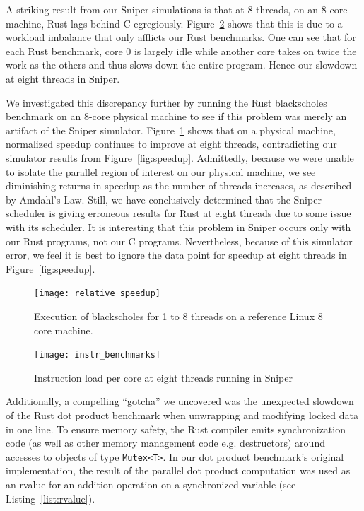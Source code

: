 A striking result from our Sniper simulations is that at 8 threads, on an 8 core machine, Rust lags behind C egregiously. Figure~\ref{fig:instr_load} shows that this is due to a workload imbalance that only afflicts our Rust benchmarks. One can see that for each Rust benchmark, core 0 is largely idle while another core takes on twice the work as the others and thus slows down the entire program. Hence our slowdown at eight threads in Sniper.

We investigated this discrepancy further by running the Rust blackscholes benchmark on an 8-core physical machine to see if this problem was merely an artifact of the Sniper simulator. Figure~\ref{fig:baremetal} shows that on a physical machine, normalized speedup continues to improve at eight threads, contradicting our simulator results from Figure~\ref{fig:speedup}. Admittedly, because we were unable to isolate the parallel region of interest on our physical machine, we see diminishing returns in speedup as the number of threads increases, as described by Amdahl's Law. Still, we have conclusively determined that the Sniper scheduler is giving erroneous results for Rust at eight threads due to some issue with its scheduler. It is interesting that this problem in Sniper occurs only with our Rust programs, not our C programs. Nevertheless, because of this simulator error, we feel it is best to ignore the data point for speedup at eight threads in Figure~\ref{fig:speedup}.
\begin{figure}
\texttt{[image: relative\_speedup]}
\caption{Execution of blackscholes for 1 to 8 threads on a reference Linux 8 core machine.}
\label{fig:baremetal}
\end{figure}

\begin{figure}
\texttt{[image: instr\_benchmarks]}\\
\caption{Instruction load per core at eight threads running in Sniper}
\label{fig:instr_load}
\end{figure}

Additionally, a compelling ``gotcha'' we uncovered was the unexpected slowdown of the Rust dot product benchmark when unwrapping and modifying locked data in one line. To ensure memory safety, the Rust compiler emits synchronization code (as well as other memory management code e.g. destructors) around accesses to objects of type \texttt{Mutex<T>}. In our dot product benchmark's original implementation, the result of the parallel dot product computation was used as an rvalue for an addition operation on a synchronized variable (see Listing~\ref{list:rvalue}).

